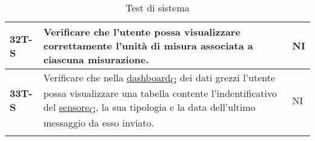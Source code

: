 \begin{longtable}{|>{\raggedright\arraybackslash}m{}|>{\raggedright\arraybackslash}m{}|>{\raggedright\arraybackslash}m{}|}
	\hline
	\textbf{32T-S}  & Verificare che l’utente possa visualizzare correttamente l’unità di misura associata a ciascuna misurazione.                                                                                     & NI             \\
	\hline
	\textbf{33T-S}  & Verificare che nella \href{https://7last.github.io/docs/pb/documentazione-interna/glossario\#dashboard}{dashboard\textsubscript{G}} dei dati grezzi l'utente possa visualizzare una tabella contente l'indentificativo del \href{https://7last.github.io/docs/pb/documentazione-interna/glossario\#sensore}{sensore\textsubscript{G}}, la sua tipologia e la data dell'ultimo messaggio da esso inviato. & NI             \\
	\hline
	\caption{Test di sistema}
\end{longtable}


